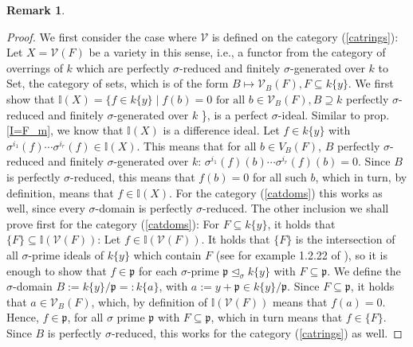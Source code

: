 \documentclass{article}
\def\I{\mathbb{I}}
\def\V{\mathcal{V}}
\def\p{\mathfrak{p}}
\def\s{\sigma}
\def\si{\unlhd_{\sigma}}
\def\sSpec{\sigma\text{-Spec}}
\def\fa{\text{ for all }}
\newenvironment{bew}{\begin{proof}[Proof]}{\end{proof}}
\theoremstyle{plain}
\newtheorem{ex}[Satz]{Example}
\theoremstyle{definition}
\newtheorem{rem}[Satz]{Remark}
\begin{document}
\begin{rem}
\begin{bew}
We first consider the case where $\V$ is defined on the category (\ref{catrings}):
Let $X = \V(F)$ be a variety in this sense, i.e., a functor from the category of overrings of $k$ which are perfectly $\s$-reduced and finitely $\s$-generated over $k$ to Set, the category of sets,
which is of the form $B \mapsto \V_B(F), F \subseteq k\{y\}$. We first show that $\I(X) = \{ f \in k\{y\} \mid f(b) = 0 \fa b \in \V_B(F), B \supseteq k$ perfectly $\s$-reduced and finitely $\s$-generated over $k$ \},
 is a perfect $\s$-ideal. Similar to prop. \ref{I=F_m}, we know that $\I(X)$ is a difference ideal. Let $f \in k\{y\}$ with $\s^{i_1}(f) \cdots \s^{i_r}(f) \in \I(X)$. This means that for all $b \in V_B(F)$,
 $B$ perfectly $\s$-reduced and finitely $\s$-generated over $k$: $\s^{i_1}(f)(b) \cdots \s^{i_r}(f)(b) = 0$. Since $B$ is perfectly $\s$-reduced, this means that $f(b) = 0$ for all such $b$,
 which in turn, by definition, means that $f \in \I(X)$. For the category (\ref{catdoms}) this works as well, since every $\s$-domain is perfectly $\s$-reduced.
The other inclusion we shall prove first for the category (\ref{catdoms}):
For $F \subseteq k\{y\}$, it holds that $\{F\} \subseteq \I(\V(F))$: Let $f \in \I(\V(F))$.
It holds that $\{F\}$ is the intersection of all $\s$-prime ideals of $k\{y\}$ which contain $F$ (see for example 1.2.22 of \cite{wibmer}), so it is enough to show that $f \in \p$ for each $\s$-prime $\p \si k\{y\}$ with $F \subseteq \p$.
We define the $\s$-domain $B:= k\{y\}/\p =: k\{a\}$, with $a := y + \p \in k\{y\}/\p$. Since $F \subseteq \p$, it holds that $a \in \V_B(F)$, which, by definition of $\I(\V(F))$ means that $f(a) = 0$. Hence, $f \in \p$, for all $\s$ prime $\p$
with $F \subseteq \p$, which in turn means that $f \in \{F\}$. Since $B$ is perfectly $\s$-reduced, this works for the category (\ref{catrings}) as well.
\end{bew}

\end{rem}

\end{document}
